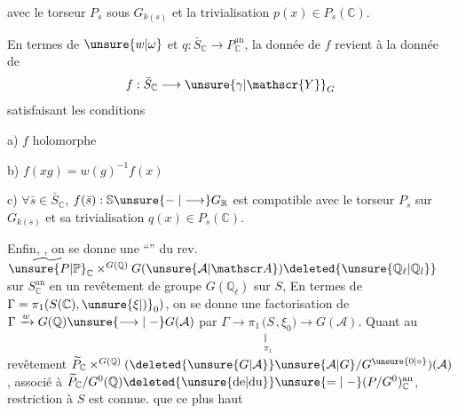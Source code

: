 avec le torseur $P_s$ sous $G_{k(s)}$ et la trivialisation $p(x)\in P_s(\mathbb{C})$.

En termes de $\unsure{w|\omega}$ et $q:\bar S_{\mathbb{C}}\longrightarrow P_{\mathbb{C}}^{\mathrm{an}}$, la donnée de $f$ revient à la donnée de
\[
f:\bar S_{\mathbb{C}}\longrightarrow\unsure{\gamma|\mathscr{Y}}_G
\]
satisfaisant les conditions

a) $f$ holomorphe

b) $f(xg)=w(g)^{-1}f(x)$

c)  $\forall\bar s\in\bar S_{\mathbb{C}}$,  $f(\bar s):\mathbb{S}\unsure{\relbar|\longrightarrow}G_{\mathbb{R}}$ est compatible avec le torseur $P_s$ sur $G_{k(s)}$ et sa trivialisation $q(x)\in P_s(\mathbb{C})$.

Enfin, , on se donne une ``'' du rev. $\widetilde{\unsure{P|\mathbb P}}_{\mathbb{C}}\mathbin{\times}^{G(\mathbb{Q})}G(\unsure{\mathcal A|\mathscr A})\deleted{\unsure{\mathbb{Q}_{\ell}|\mathbb{Q}_l}}$ sur $S_{\mathbb{C}}^{\mathrm{an}}$ en un revêtement
 de groupe $G(\mathbb{Q}_{\ell})$ sur $S$, En termes  de $\Gamma=\pi_1(S(\mathbb{C}),\unsure{\xi|\mathord{)}}_0)$, on se donne une factorisation de $\Gamma\xrightarrow{w}G(\mathbb{Q})\unsure{\longrightarrow|\relbar}G(\mathcal A)$ par $\Gamma\longrightarrow\pi_1\underset{\substack{\Vert\\\pi_1}}{(S},\xi_0)\longrightarrow G(\mathcal A)$. Quant au revêtement $\widetilde P_{\mathbb{C}}\mathbin{\times}^{G(\mathbb{Q})}(\deleted{\unsure{G|\mathcal A}}\unsure{\mathcal A|G}/G^{\unsure{0|\circ}})(\mathcal A)$,  associé à $\widetilde P_{\mathbb{C}}/G^0(\mathbb{Q})\deleted{\unsure{\text{de}|\text{du}}}\unsure{=|\relbar}(P/G^0)_{\mathbb{C}}^{\mathrm{an}}$,      restriction à $S$  est connue.  que ce    plus haut


